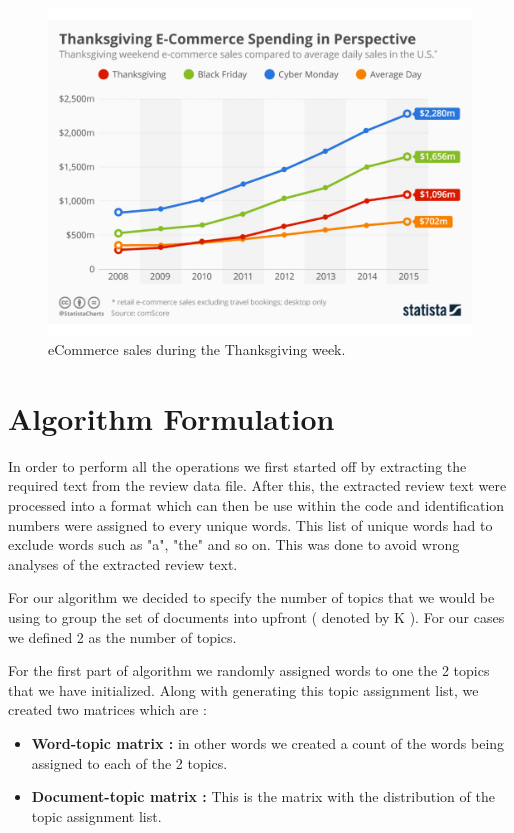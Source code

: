 \documentclass{article}
\begin{document}
\begin{figure}[ht]
	\centerline{\includegraphics[width=\columnwidth]{Thanksgiving_sales}}
	\caption{eCommerce sales during the Thanksgiving week.}
	\label{thanksgiving}
	\vskip 0.15in
\end{figure} 


\section{Algorithm Formulation} 
	\label{algorithm} 

	In order to perform all the operations we first started off by extracting the required text from the review data file. After this, 		the extracted review text were processed into a format which can then be use within the code and identification numbers 		were assigned to every unique words. This list of unique words had to exclude words such as "a", "the" and so on. This 		was done to avoid wrong analyses of the extracted review text. 
	
	For our algorithm we decided to specify the number of topics that we would be using to group the set of documents into 		upfront ( denoted by K ). For our cases we defined 2 as the number of topics.

	For the first part of algorithm we randomly assigned words to one the 2 topics that we have initialized. Along with			generating this topic assignment list, we created two matrices which are :
	
	\begin{itemize}
	 	\item \textbf{Word-topic matrix :} in other words we created a count of the words being assigned to each of the 2 				topics. 
		\item \textbf{Document-topic matrix :} This is the matrix with the distribution of the topic assignment list.
	\end{itemize}
	
\end{document}

